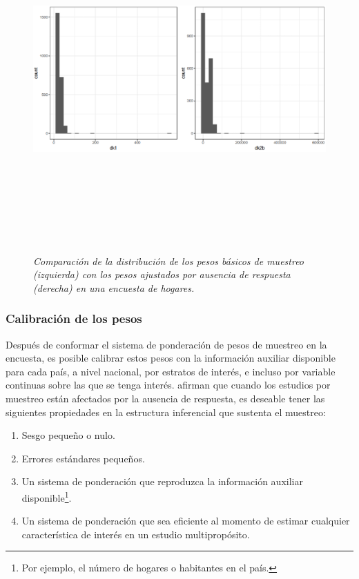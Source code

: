 \documentclass[12pt,spanish,]{book}
\providecommand{\tightlist}{%
  \setlength{\itemsep}{0pt}\setlength{\parskip}{0pt}}
\let\rmarkdownfootnote\footnote%
\def\footnote{\protect\rmarkdownfootnote}
\begin{document}
\begin{figure}
\centering
\includegraphics[width=\textwidth,height=5.20833in]{Pics/17.png}
\caption{\emph{Comparación de la distribución de los pesos básicos de muestreo (izquierda) con los pesos ajustados por ausencia de respuesta (derecha) en una encuesta de hogares.}}
\end{figure}

\hypertarget{calibracion-de-los-pesos}{%
\subsubsection*{Calibración de los pesos}\label{calibracion-de-los-pesos}}

Después de conformar el sistema de ponderación de pesos de muestreo en la encuesta, es posible calibrar estos pesos con la información auxiliar disponible para cada país, a nivel nacional, por estratos de interés, e incluso por variable continuas sobre las que se tenga interés. \textcite{Sarndal_Lundstrom_2006} afirman que cuando los estudios por muestreo están afectados por la ausencia de respuesta, es deseable tener las siguientes propiedades en la estructura inferencial que sustenta el muestreo:

\begin{enumerate}
\def\labelenumi{\arabic{enumi}.}
\tightlist
\item
  Sesgo pequeño o nulo.
\item
  Errores estándares pequeños.
\item
  Un sistema de ponderación que reproduzca la información auxiliar disponible\footnote{Por ejemplo, el número de hogares o habitantes en el país.}.
\item
  Un sistema de ponderación que sea eficiente al momento de estimar cualquier característica de interés en un estudio multipropósito.
\end{enumerate}
\end{document}
